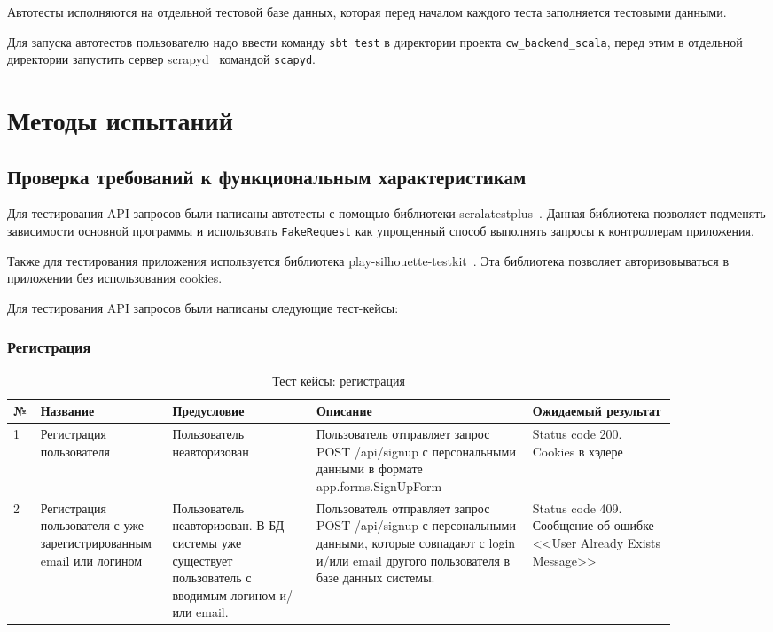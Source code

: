 \documentclass[a4paper,12pt]{article}
\begin{document}
	Автотесты исполняются на отдельной тестовой базе данных, которая перед началом каждого теста заполняется тестовыми данными. 
	
	Для запуска автотестов пользователю надо ввести команду \texttt{sbt test} в директории проекта \texttt{cw\_backend\_scala}, перед этим в отдельной директории запустить сервер scrapyd~\cite{scrapyd} командой \texttt{scapyd}.
						\newpage
	\section{Методы испытаний}
	\subsection{Проверка требований к функциональным характеристикам}
	Для тестирования API запросов были написаны автотесты с помощью библиотеки scralatestplus~\cite{scalatestplus}. Данная библиотека позволяет подменять зависимости основной программы и использовать \texttt{FakeRequest} как упрощенный способ выполнять запросы к контроллерам приложения. 
	
	Также для тестирования приложения используется библиотека play-silhouette-testkit~\cite{playsilhouettetestkit}. Эта библиотека позволяет авторизовываться в приложении без использования cookies.
	
	Для тестирования API запросов были написаны следующие тест-кейсы:
	
	\subsubsection{Регистрация}
	\begin{table}[htb]
		\centering
		\begin{tabular}{|p{0.02\linewidth}|p{0.15\linewidth}|p{0.2\linewidth}|p{0.3\linewidth}|p{0.2\linewidth}|} 
			\hline
			\textbf{№} & \textbf{Название} & \textbf{Предусловие} & \textbf{Описание} & \textbf{Ожидаемый результат} \\ \hline
			1 & Регистрация пользователя & Пользователь неавторизован & Пользователь отправляет запрос POST /api/signup с персональными данными в формате app.forms.SignUpForm & Status code 200. Cookies в хэдере \\ \hline
			2 & Регистрация пользователя с уже зарегистрированным email или логином & Пользователь неавторизован. В БД системы уже существует пользователь с вводимым логином и/или email. & Пользователь отправляет запрос POST /api/signup с персональными данными, которые совпадают с login и/или email другого пользователя в базе данных системы. & Status code 409. Сообщение об ошибке <<User Already Exists Message>> \\ \hline
		\end{tabular}
	\caption{Тест кейсы: регистрация}
	\end{table}
	
\end{document}
